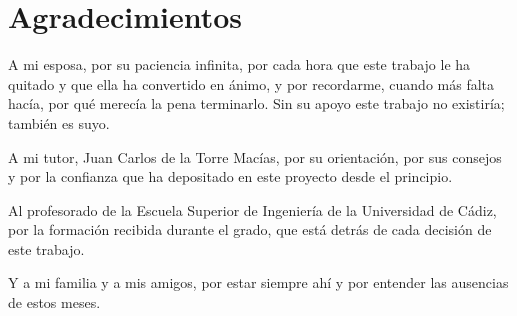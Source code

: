 \chapter*{Agradecimientos}

A mi esposa, por su paciencia infinita, por cada hora que este trabajo le ha
quitado y que ella ha convertido en ánimo, y por recordarme, cuando más falta
hacía, por qué merecía la pena terminarlo. Sin su apoyo este trabajo no
existiría; también es suyo.

A mi tutor, Juan Carlos de la Torre Macías, por su orientación, por sus
consejos y por la confianza que ha depositado en este proyecto desde el
principio.

Al profesorado de la Escuela Superior de Ingeniería de la Universidad de
Cádiz, por la formación recibida durante el grado, que está detrás de cada
decisión de este trabajo.

Y a mi familia y a mis amigos, por estar siempre ahí y por entender las
ausencias de estos meses.
